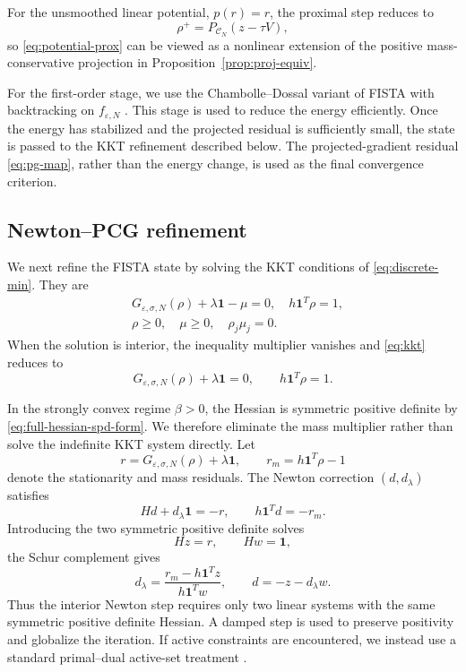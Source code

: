 \documentclass[11pt]{article}
\newcommand{\CN}{\mathcal{C}_N}
\newcommand{\eps}{\varepsilon}
\newcommand{\sig}{\sigma}
\theoremstyle{plain}
\theoremstyle{definition}
\numberwithin{equation}{section}
\begin{document}
For the unsmoothed linear potential, $p(r)=r$, the proximal step
reduces to
\[
\rho^+=P_{\CN}(z-\tau V),
\]
so \eqref{eq:potential-prox} can be viewed as a nonlinear extension
of the positive mass-conservative projection in
Proposition~\ref{prop:proj-equiv}.

For the first-order stage, we use the Chambolle--Dossal variant of
FISTA with backtracking on $f_{\eps,N}$
\cite{BeckTeboulle2009,ChambolleDossal2015}. This stage is used to
reduce the energy efficiently. Once the energy has stabilized and
the projected residual is sufficiently small, the state is passed to
the KKT refinement described below. The projected-gradient residual
\eqref{eq:pg-map}, rather than the energy change, is used as the final
convergence criterion.

\subsection{Newton--PCG refinement} \label{subsec:Newton-PCG}

We next refine the FISTA state by solving the KKT conditions of
\eqref{eq:discrete-min}. They are
\begin{equation}
\label{eq:kkt}
\begin{aligned}
& G_{\eps,\sig,N}(\rho)+\lambda\bm 1-\mu =0, \quad
h\bm 1^T\rho =1,\\
&\rho\ge0,\quad
\mu\ge0,\quad
\rho_j\mu_j=0.
\end{aligned}
\end{equation}
When the solution is interior, the inequality multiplier vanishes and
\eqref{eq:kkt} reduces to
\begin{equation}
\label{eq:interior-kkt}
G_{\eps,\sig,N}(\rho)+\lambda\bm1=0,
\qquad
h\bm1^T\rho=1.
\end{equation}

In the strongly convex regime $\beta>0$, the Hessian is symmetric positive definite by
\eqref{eq:full-hessian-spd-form}. We therefore eliminate the mass
multiplier rather than solve the indefinite KKT system directly.
Let
\[
r=G_{\eps,\sig,N}(\rho)+\lambda\bm1,
\qquad
r_m=h\bm1^T\rho-1
\]
denote the stationarity and mass residuals. 
The Newton correction
$(d,d_\lambda)$ satisfies
\[
Hd+d_\lambda\bm1=-r,
\qquad
h\bm1^Td=-r_m.
\]
Introducing the two symmetric positive definite solves
\[
Hz=r,
\qquad
Hw=\bm1,
\]
the Schur complement gives
\begin{equation}
\label{eq:schur-two-solves}
d_\lambda
=
\frac{r_m-h\bm1^Tz}{h\bm1^Tw},
\qquad
d=-z-d_\lambda w.
\end{equation}
Thus the interior Newton step requires only two linear systems with
the same symmetric positive definite Hessian. A damped step is used to preserve positivity
and globalize the iteration. If active constraints are encountered,
we instead use a standard primal--dual active-set treatment
\cite{Ulbrich2011}.
\end{document}
